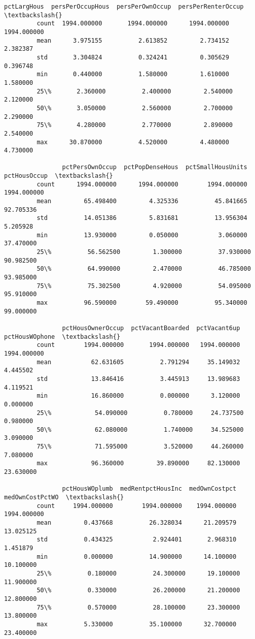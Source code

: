 \documentclass[11pt]{llncs}
\begin{document}
\begin{Verbatim}[commandchars=\\\{\}]
                pctLargHous  persPerOccupHous  persPerOwnOccup  persPerRenterOccup  \textbackslash{}
         count  1994.000000       1994.000000      1994.000000         1994.000000   
         mean      3.975155          2.613852         2.734152            2.382387   
         std       3.304824          0.324241         0.305629            0.396748   
         min       0.440000          1.580000         1.610000            1.580000   
         25\%       2.360000          2.400000         2.540000            2.120000   
         50\%       3.050000          2.560000         2.700000            2.290000   
         75\%       4.280000          2.770000         2.890000            2.540000   
         max      30.870000          4.520000         4.480000            4.730000   
         
                pctPersOwnOccup  pctPopDenseHous  pctSmallHousUnits  pctHousOccup  \textbackslash{}
         count      1994.000000      1994.000000        1994.000000   1994.000000   
         mean         65.498400         4.325336          45.841665     92.705336   
         std          14.051386         5.831681          13.956304      5.205928   
         min          13.930000         0.050000           3.060000     37.470000   
         25\%          56.562500         1.300000          37.930000     90.982500   
         50\%          64.990000         2.470000          46.785000     93.985000   
         75\%          75.302500         4.920000          54.095000     95.910000   
         max          96.590000        59.490000          95.340000     99.000000   
         
                pctHousOwnerOccup  pctVacantBoarded  pctVacant6up  pctHousWOphone  \textbackslash{}
         count        1994.000000       1994.000000   1994.000000     1994.000000   
         mean           62.631605          2.791294     35.149032        4.445502   
         std            13.846416          3.445913     13.989683        4.119521   
         min            16.860000          0.000000      3.120000        0.000000   
         25\%            54.090000          0.780000     24.737500        0.980000   
         50\%            62.080000          1.740000     34.525000        3.090000   
         75\%            71.595000          3.520000     44.260000        7.080000   
         max            96.360000         39.890000     82.130000       23.630000   
         
                pctHousWOplumb  medRentpctHousInc  medOwnCostpct  medOwnCostPctWO  \textbackslash{}
         count     1994.000000        1994.000000    1994.000000      1994.000000   
         mean         0.437668          26.328034      21.209579        13.025125   
         std          0.434325           2.924401       2.968310         1.451879   
         min          0.000000          14.900000      14.100000        10.100000   
         25\%          0.180000          24.300000      19.100000        11.900000   
         50\%          0.330000          26.200000      21.200000        12.800000   
         75\%          0.570000          28.100000      23.300000        13.800000   
         max          5.330000          35.100000      32.700000        23.400000   
         

\end{Verbatim}
\end{document}
